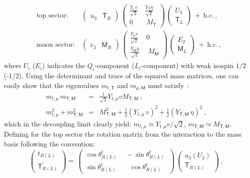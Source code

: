 \begin{eqnarray}
	\label{eq:Mixing_Partner}
	& \textrm{top sector:} & \ 
	\left(  \begin{array}{cc}
		\bar{u}_3 & \overline{\mathsf{T}}_R
	\end{array} \right) \, \begin{pmatrix}
		\frac{Y_t  \, v}{\sqrt{2}} \ &  \frac{Y_{\mathsf{T}} \eta}{\sqrt{2}} \ \\
		0 \ & \ M_\mathsf{T}
	\end{pmatrix} \,
	\left(  \begin{array}{c}
		U_3 \\  \mathsf{T}_L
	\end{array} \right) \ + \ \mathrm{h.c.} \, , \\
	& \textrm{muon sector:} & \ 
	\left(  \begin{array}{cc}
		\bar{e}_2 & \overline{\mathsf{M}}_{R}
	\end{array} \right) \, \begin{pmatrix}
		\frac{Y_\mu v}{\sqrt{2}} \ & 0\ \\
		\frac{Y_{\mathsf{M}} \eta }{ \sqrt{2}}  \ & \ M_\mathsf{M}
	\end{pmatrix} \,
	\left(  \begin{array}{c}
		E_{2} \\  \mathsf{M}_L
	\end{array} \right) \ + \ \mathrm{h.c.} \, , \nonumber
\end{eqnarray}
where $U_{i}$ ($E_{i}$) indicates the $Q_{i}$-component ($L_{i}$-component) with weak isospin $1/2$ (-1/2). Using the determinant and trace of the squared mass matrices, one can easily show that the eigenvalues $m_{t,\mathsf{T}}$ and $m_{\mu,\mathsf{M}}$ must satisfy~\cite{Kamenik:2017tnu}:
\begin{eqnarray}
	\label{eq:Mass_Eigenvalues}
	m_{t,\mu} \,  m_{\mathsf{T,M}} & = & \frac{1}{\sqrt{2}} Y_{t,\mu} v M_{\mathsf{T,M}} \ , \\ m_{t,\mu}^2 + m_{\mathsf{T,M}}^2 & = & 
	M_{\mathsf{T,M}}^2 + \frac{1}{2} (Y_{t,\mu} \, v)^2 + \frac{1}{2} (Y_{\mathsf{T,M}} \, \eta)^2 \ , \nonumber
\end{eqnarray}
which in the decoupling limit clearly yield: $m_{t,\mu} \simeq Y_{t,\mu} v / \sqrt{2}$, $m_{\mathsf{T,M}} \simeq M_{\mathsf{T,M}}$.
Defining for the top sector the rotation matrix from the interaction to the mass basis following the convention:
\begin{equation}
	\label{eq:rot_phys_states} 
	\left(  \begin{array}{c}
		t_{R (L)} \\  \mathsf{T}^{\prime}_{R (L)}
	\end{array} \right) = \,
	\begin{pmatrix}
		\cos \theta^{t}_{R(L)} \ & \ - \sin \theta^{t}_{R(L)} \ \\
		\sin \theta^{t}_{R(L)}  \ & \ \ \ \, \cos \theta^{t}_{R(L)}
	\end{pmatrix} \,
	\left(  \begin{array}{c}
		u_{3} (U_{3}) \\  
		\mathsf{T}_{R (L)}
	\end{array} \right) \ ,
\end{equation}
